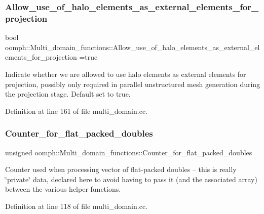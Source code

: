 \subsubsection{\texorpdfstring{Allow\+\_\+use\+\_\+of\+\_\+halo\+\_\+elements\+\_\+as\+\_\+external\+\_\+elements\+\_\+for\+\_\+projection}{Allow\_use\_of\_halo\_elements\_as\_external\_elements\_for\_projection}}
{\footnotesize\ttfamily bool oomph\+::\+Multi\+\_\+domain\+\_\+functions\+::\+Allow\+\_\+use\+\_\+of\+\_\+halo\+\_\+elements\+\_\+as\+\_\+external\+\_\+elements\+\_\+for\+\_\+projection =true}



Indicate whether we are allowed to use halo elements as external elements for projection, possibly only required in parallel unstructured mesh generation during the projection stage. Default set to true. 



Definition at line 161 of file multi\+\_\+domain.\+cc.

\mbox{\label{namespaceoomph_1_1Multi__domain__functions_aeb7431547acc61e750fcc456a25ffc13}} 
\subsubsection{\texorpdfstring{Counter\+\_\+for\+\_\+flat\+\_\+packed\+\_\+doubles}{Counter\_for\_flat\_packed\_doubles}}
{\footnotesize\ttfamily unsigned oomph\+::\+Multi\+\_\+domain\+\_\+functions\+::\+Counter\+\_\+for\+\_\+flat\+\_\+packed\+\_\+doubles}



Counter used when processing vector of flat-\/packed doubles -- this is really \char`\"{}private\char`\"{} data, declared here to avoid having to pass it (and the associated array) between the various helper functions. 



Definition at line 118 of file multi\+\_\+domain.\+cc.




